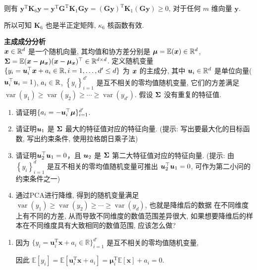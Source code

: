 \documentclass[answers]{exam}  %
\begin{document}
\begin{questions}
\begin{solution}
\begin{enumerate}
            则有 $\bm{y}^{\mathrm{T}}\bm{K}_6\bm{y} = \bm{y}^{\mathrm{T}}\bm{G}^{\mathrm{T}}\bm{K}_1\bm{G}\bm{y} = (\bm{G}\bm{y})^{\mathrm{T}}\bm{K}_1(\bm{G}\bm{y}) \ge 0$, 对于任何 $m$ 维向量 $\bm{y}$.

            所以可知 $\bm{K}_6$ 也是半正定矩阵, $\kappa_6$ 核函数有效.
    \end{enumerate}
  \end{solution}

  \question [20] \textbf{主成成分分析} \\
  ${\boldsymbol{x}} \in \mathbb{R}^{d}$ 是一个随机向量, 其均值和协方差分别是 $\boldsymbol{\mu}=\mathbb{E}({\boldsymbol{x}}) \in \mathbb{R}^{d}$, $\boldsymbol{\Sigma}=\mathbb{E}({\boldsymbol{x}}-\boldsymbol{\mu}_{\boldsymbol{x}})({\boldsymbol{x}}-\boldsymbol{\mu}_{\boldsymbol{x}})^{\top} \in \mathbb{R}^{d \times  d}$. 定义随机变量 $\{y_{i}=\boldsymbol{u}_{i}^{\top} {\boldsymbol{x}}+a_{i} \in \mathbb{R}, i=1, \ldots, {d'} \leq d\}$ 为 ${\boldsymbol{x}}$ 的主成分, 其中 $\boldsymbol{u}_{i} \in \mathbb{R}^{d}$ 是单位向量($\boldsymbol{u}_i^\top \boldsymbol{u}_i = 1$), $a_{i} \in \mathbb{R}$, $\left\{y_{i}\right\}_{i=1}^{{d'}}$ 是互不相关的零均值随机变量, 它们的方差满足 $\operatorname{var}\left(y_{1}\right) \geq \operatorname{var}\left(y_{2}\right) \geq \cdots \geq \operatorname{var}\left(y_{{d'}}\right)$. 假设 $\boldsymbol{\Sigma}$ 没有重复的特征值.
  \begin{enumerate}
    \item  请证明$\{a_{i}=-\boldsymbol{u}_{i}^{\top} \boldsymbol{\mu}\}_{i=1}^{d'}$.
    \item 请证明$\boldsymbol{u}_{1}$ 是 $\boldsymbol{\Sigma}$ 最大的特征值对应的特征向量. (提示: 写出要最大化的目标函数, 写出约束条件, 使用拉格朗日乘子法)
    \item 请证明$\boldsymbol{u}_{2}^{\top} \boldsymbol{u}_{1}=0$，且 $\boldsymbol{u}_{2}$ 是 $\boldsymbol{\Sigma}$ 第二大特征值对应的特征向量. (提示: 由 $\left\{y_{i}\right\}_{i=1}^{d}$ 是互不相关的零均值随机变量可推出 $\boldsymbol{u}_{2}^{\top} \boldsymbol{u}_{1}=0$, 可作为第二小问的约束条件之一)
    \item 通过PCA进行降维, 得到的随机变量满足$\operatorname{var}\left(y_{1}\right) \geq \operatorname{var}\left(y_{2}\right) \geq \cdots \geq \operatorname{var}\left(y_{d}\right)$, 也就是降维后的数据 在不同维度上有不同的方差, 从而导致不同维度的数值范围差异很大, 如果想要降维后的样本在不同维度具有大致相同的数值范围, 应该怎么做?
  \end{enumerate}
  \begin{solution}
    \begin{enumerate}
      \item

            因为 $\{ y_i = \bm{u}_i^{\mathrm{T}}\bm{x} + a_i \in \mathbb{R} \}_{i=1}^{d'}$ 是互不相关的零均值随机变量,

            因此 $\mathbb{E}[y_i] = \mathbb{E}[\bm{u}_i^{\mathrm{T}}\bm{x} + a_i] = \bm{\mu}_i^{\mathrm{T}}\mathbb{E}[\bm{x}] + a_i = 0$.


\end{enumerate}
\end{solution}
\end{questions}
\end{document}
